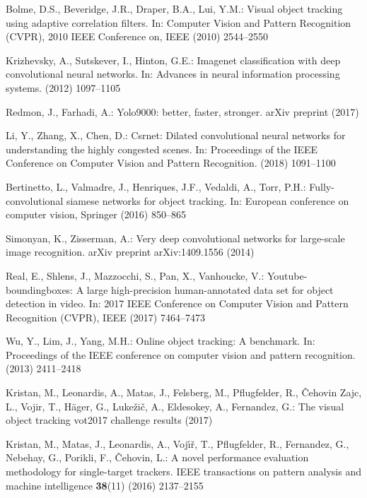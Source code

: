 \documentclass[runningheads]{llncs}
\begin{document}
\begin{thebibliography}{10}
Bolme, D.S., Beveridge, J.R., Draper, B.A., Lui, Y.M.:
\newblock Visual object tracking using adaptive correlation filters.
\newblock In: Computer Vision and Pattern Recognition (CVPR), 2010 IEEE
  Conference on, IEEE (2010)  2544--2550

Krizhevsky, A., Sutskever, I., Hinton, G.E.:
\newblock Imagenet classification with deep convolutional neural networks.
\newblock In: Advances in neural information processing systems. (2012)
  1097--1105

Redmon, J., Farhadi, A.:
\newblock Yolo9000: better, faster, stronger.
\newblock arXiv preprint (2017)

Li, Y., Zhang, X., Chen, D.:
\newblock Csrnet: Dilated convolutional neural networks for understanding the
  highly congested scenes.
\newblock In: Proceedings of the IEEE Conference on Computer Vision and Pattern
  Recognition. (2018)  1091--1100

Bertinetto, L., Valmadre, J., Henriques, J.F., Vedaldi, A., Torr, P.H.:
\newblock Fully-convolutional siamese networks for object tracking.
\newblock In: European conference on computer vision, Springer (2016)  850--865

Simonyan, K., Zisserman, A.:
\newblock Very deep convolutional networks for large-scale image recognition.
\newblock arXiv preprint arXiv:1409.1556 (2014)

Real, E., Shlens, J., Mazzocchi, S., Pan, X., Vanhoucke, V.:
\newblock Youtube-boundingboxes: A large high-precision human-annotated data
  set for object detection in video.
\newblock In: 2017 IEEE Conference on Computer Vision and Pattern Recognition
  (CVPR), IEEE (2017)  7464--7473

Wu, Y., Lim, J., Yang, M.H.:
\newblock Online object tracking: A benchmark.
\newblock In: Proceedings of the IEEE conference on computer vision and pattern
  recognition. (2013)  2411--2418

Kristan, M., Leonardis, A., Matas, J., Felsberg, M., Pflugfelder, R.,
  \v{C}ehovin Zajc, L., Vojir, T., H\"{a}ger, G., Luke\v{z}i\v{c}, A.,
  Eldesokey, A., Fernandez, G.:
\newblock The visual object tracking vot2017 challenge results (2017)

Kristan, M., Matas, J., Leonardis, A., Voj{\'\i}{\v{r}}, T., Pflugfelder, R.,
  Fernandez, G., Nebehay, G., Porikli, F., {\v{C}}ehovin, L.:
\newblock A novel performance evaluation methodology for single-target
  trackers.
\newblock IEEE transactions on pattern analysis and machine intelligence
  \textbf{38}(11) (2016)  2137--2155


\end{thebibliography}
\end{document}
